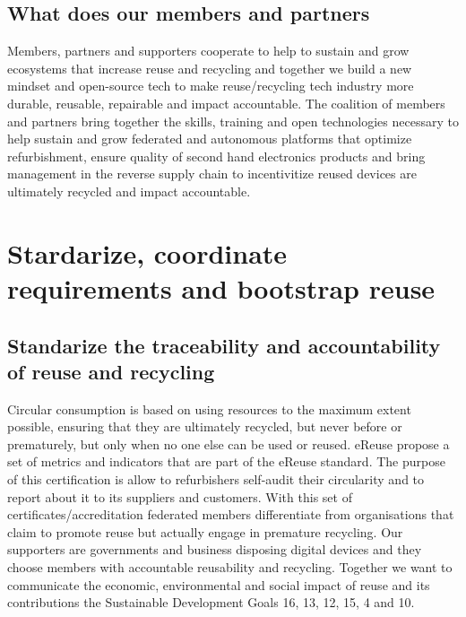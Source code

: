 \documentclass[
]{book}
\begin{document}
\hypertarget{what-does-our-members-and-partners}{%
\subsection{What does our members and partners}\label{what-does-our-members-and-partners}}

Members, partners and supporters cooperate to help to sustain and grow ecosystems that increase reuse and recycling and together we build a new mindset and open-source tech to make reuse/recycling tech industry more durable, reusable, repairable and impact accountable. The coalition of members and partners bring together the skills, training and open technologies necessary to help sustain and grow federated and autonomous platforms that optimize refurbishment, ensure quality of second hand electronics products and bring management in the reverse supply chain to incentivitize reused devices are ultimately recycled and impact accountable.

\hypertarget{stardarize-coordinate-requirements-and-bootstrap-reuse}{%
\section{Stardarize, coordinate requirements and bootstrap reuse}\label{stardarize-coordinate-requirements-and-bootstrap-reuse}}

\hypertarget{standarize-the-traceability-and-accountability-of-reuse-and-recycling}{%
\subsection{Standarize the traceability and accountability of reuse and recycling}\label{standarize-the-traceability-and-accountability-of-reuse-and-recycling}}

Circular consumption is based on using resources to the maximum extent possible, ensuring that they are ultimately recycled, but never before or prematurely, but only when no one else can be used or reused. eReuse propose a set of metrics and indicators that are part of the eReuse standard. The purpose of this certification is allow to refurbishers self-audit their circularity and to report about it to its suppliers and customers. With this set of certificates/accreditation federated members differentiate from organisations that claim to promote reuse but actually engage in premature recycling. Our supporters are governments and business disposing digital devices and they choose members with accountable reusability and recycling. Together we want to communicate the economic, environmental and social impact of reuse and its contributions the Sustainable Development Goals 16, 13, 12, 15, 4 and 10.
\end{document}
